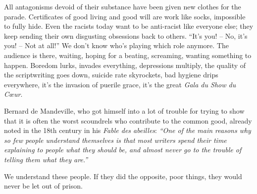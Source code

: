 All antagonisms devoid of their substance have been given new clothes for the parade. Certificates of good living and good will are work like socks, impossible to fully hide. Even the racists today want to be anti-racist like everyone else; they keep sending their own disgusting obsessions back to others. ``It's you! -- No, it's you! -- Not at all!''  We don't know who's playing which role anymore. The audience is there, waiting, hoping for a beating, screaming, wanting something to happen. Boredom lurks, invades everything, depressions multiply, the quality of the scriptwriting goes down, suicide rate skyrockets, bad hygiene drips everywhere, it's the invasion of puerile grace, it's the great \textit{Gala du Show du Cœur}.

Bernard de Mandeville, who got himself into a lot of trouble for trying to show that it is often the worst scoundrels who contribute to the common good, already noted in the 18th century in his \textit{Fable des abeilles}: \textit{``One of the main reasons why so few people understand themselves is that most writers spend their time explaining to people what they should be, and almost never go to the trouble of telling them what they are.''}

We understand these people. If they did the opposite, poor things, they would never be let out of prison.